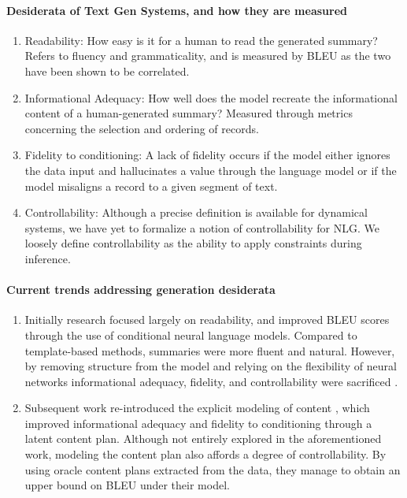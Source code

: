 \documentclass[11pt]{article}
\begin{document}
\paragraph{Desiderata of Text Gen Systems, and how they are measured}
\begin{enumerate}
\item Readability: How easy is it for a human to read the generated summary?
Refers to fluency and grammaticality, and is measured by BLEU as the two have been
shown to be correlated.
\item Informational Adequacy: How well does the model recreate the informational content
of a human-generated summary?
Measured through metrics concerning the selection and ordering of records.
\item Fidelity to conditioning: 
A lack of fidelity occurs if the model either ignores the data input and hallucinates
a value through the language model or if the model misaligns a record to a given segment of text.
\item Controllability:
Although a precise definition is available for dynamical systems,
we have yet to formalize a notion of controllability for NLG.
We loosely define controllability as the ability to apply constraints during inference.
\end{enumerate}
\paragraph{Current trends addressing generation desiderata}
\begin{enumerate}
\item Initially research focused largely on readability,
and improved BLEU scores through the use of conditional neural language models.
Compared to template-based methods, summaries were more fluent and natural.
However, by removing structure from the model and relying on the flexibility of neural networks
informational adequacy, fidelity, and controllability were sacrificed \citep{wiseman2017d2t}.
\item Subsequent work re-introduced the explicit modeling of content
\citep{puduppully2018contentselection}, which improved informational adequacy and
fidelity to conditioning through a latent content plan.
Although not entirely explored in the aforementioned work,
modeling the content plan also affords a degree of controllability.
By using oracle content plans extracted from the data,
they manage to obtain an upper bound on BLEU under their model.
\end{enumerate}
\end{document}
